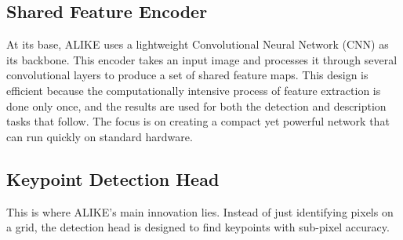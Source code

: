 \subsection{Shared Feature Encoder}
At its base, ALIKE uses a lightweight Convolutional Neural Network (CNN) as its
backbone. This encoder takes an input image and processes it through several
convolutional layers to produce a set of shared feature maps. This design is
efficient because the computationally intensive process of feature extraction
is done only once, and the results are used for both the detection and
description tasks that follow. The focus is on creating a compact yet powerful
network that can run quickly on standard hardware.
\subsection{Keypoint Detection Head}
This is where ALIKE's main innovation lies. Instead of just identifying pixels
on a grid, the detection head is designed to find keypoints with sub-pixel
accuracy.
